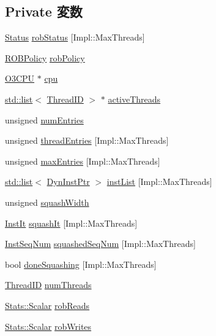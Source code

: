 \subsection*{Private 変数}
\begin{DoxyCompactItemize}
\item 
\hyperlink{classROB_a67a0db04d321a74b7e7fcfd3f1a3f70b}{Status} \hyperlink{classROB_a23d5e98a57c975ddb5106a14af875f9b}{robStatus} \mbox{[}Impl::MaxThreads\mbox{]}
\item 
\hyperlink{classROB_a7225bc69f7e1ed5d166fbf8e41be6a43}{ROBPolicy} \hyperlink{classROB_a802d14d10f8445b65f5c9d50ea0c6794}{robPolicy}
\item 
\hyperlink{classROB_a44622cf06940413482836cb62931ac3f}{O3CPU} $\ast$ \hyperlink{classROB_a1379cf882a12ac6fc9eba5da7c84b18b}{cpu}
\item 
\hyperlink{classstd_1_1list}{std::list}$<$ \hyperlink{base_2types_8hh_ab39b1a4f9dad884694c7a74ed69e6a6b}{ThreadID} $>$ $\ast$ \hyperlink{classROB_af6eaea53db532812052f71bf0380dab5}{activeThreads}
\item 
unsigned \hyperlink{classROB_a325de474a9f6652329339d9fc2ea09c0}{numEntries}
\item 
unsigned \hyperlink{classROB_a22332ec3217f4cc3ca98a489d0b6b6ab}{threadEntries} \mbox{[}Impl::MaxThreads\mbox{]}
\item 
unsigned \hyperlink{classROB_a51e5f9f0cb40d61e95b1518f1be90b73}{maxEntries} \mbox{[}Impl::MaxThreads\mbox{]}
\item 
\hyperlink{classstd_1_1list}{std::list}$<$ \hyperlink{classROB_a028ce10889c5f6450239d9e9a7347976}{DynInstPtr} $>$ \hyperlink{classROB_a7f2828a4f877a4a4d4b85a6788536b82}{instList} \mbox{[}Impl::MaxThreads\mbox{]}
\item 
unsigned \hyperlink{classROB_a2bfc819c212cc4fda248fe12fbba68b8}{squashWidth}
\item 
\hyperlink{classROB_a59263e64bd60700e053c0be08e7c93ab}{InstIt} \hyperlink{classROB_a51c7e06ec4f16d99b424b2e8ba8ff6fb}{squashIt} \mbox{[}Impl::MaxThreads\mbox{]}
\item 
\hyperlink{inst__seq_8hh_a258d93d98edaedee089435c19ea2ea2e}{InstSeqNum} \hyperlink{classROB_a97d5a7e4630ad1d017909f7504b9ec32}{squashedSeqNum} \mbox{[}Impl::MaxThreads\mbox{]}
\item 
bool \hyperlink{classROB_aa5d029365d2db19432b68bc048d8773d}{doneSquashing} \mbox{[}Impl::MaxThreads\mbox{]}
\item 
\hyperlink{base_2types_8hh_ab39b1a4f9dad884694c7a74ed69e6a6b}{ThreadID} \hyperlink{classROB_a88377f855dbf5adeeecb06b5bb821d35}{numThreads}
\item 
\hyperlink{classStats_1_1Scalar}{Stats::Scalar} \hyperlink{classROB_a982979b3e3e933cd62fa40789af9153d}{robReads}
\item 
\hyperlink{classStats_1_1Scalar}{Stats::Scalar} \hyperlink{classROB_a4c459f15b21d3f34da46fe0ca2280cf6}{robWrites}
\end{DoxyCompactItemize}


